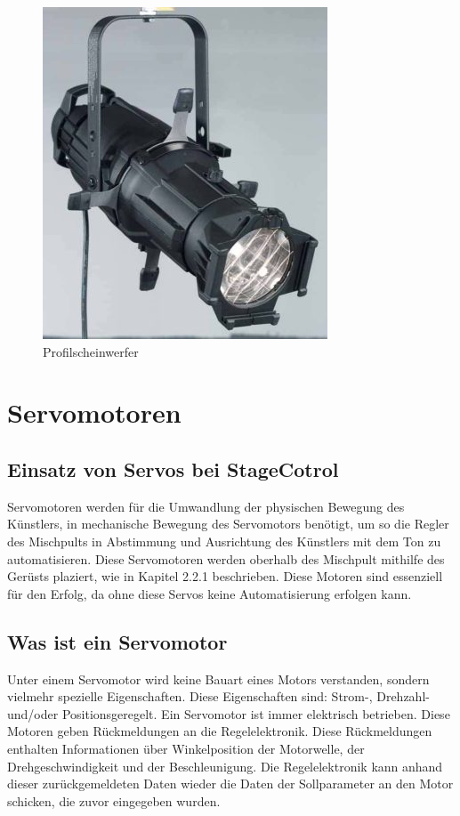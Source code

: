 \begin{figure}[H]
	\centering
	\includegraphics[width=0.7\linewidth]{images/Profilscheinwerfer.jpg}
	\caption[Profilscheinwerfer]{Profilscheinwerfer}
	\label{fig:Profilscheinwerfer}
\end{figure}

\section{Servomotoren}
\subsection{Einsatz von Servos bei StageCotrol}
Servomotoren werden für die Umwandlung der physischen Bewegung des Künstlers, in mechanische Bewegung des Servomotors benötigt, um so die Regler des Mischpults in Abstimmung und Ausrichtung des Künstlers mit dem Ton zu automatisieren. Diese Servomotoren werden oberhalb des Mischpult mithilfe des Gerüsts plaziert, wie in Kapitel 2.2.1 beschrieben. Diese Motoren sind essenziell für den Erfolg, da ohne diese Servos keine Automatisierung erfolgen kann.

\subsection{Was ist ein Servomotor}
Unter einem Servomotor wird keine Bauart eines Motors verstanden, sondern vielmehr spezielle Eigenschaften. Diese Eigenschaften sind: Strom-, Drehzahl- und/oder Positionsgeregelt. Ein Servomotor ist immer elektrisch betrieben. Diese Motoren geben Rückmeldungen an die Regelelektronik. Diese Rückmeldungen enthalten Informationen über Winkelposition der Motorwelle, der Drehgeschwindigkeit und der Beschleunigung. Die Regelelektronik kann anhand dieser zurückgemeldeten Daten wieder die Daten der Sollparameter an den Motor schicken, die zuvor eingegeben wurden. \\
\textcite{ServomotorInfo}

